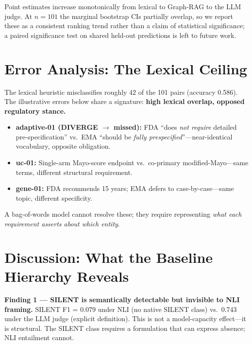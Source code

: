 \documentclass[sigconf]{acmart}
\begin{document}
Point estimates increase monotonically from lexical to Graph-RAG to the LLM
judge. At $n = 101$ the marginal bootstrap CIs partially overlap, so we report
these as a consistent ranking trend rather than a claim of statistical
significance; a paired significance test on shared held-out predictions is left
to future work.

\section{Error Analysis: The Lexical Ceiling}

The lexical heuristic misclassifies roughly 42 of the 101 pairs
(accuracy 0.586). The illustrative errors below share a signature:
\textbf{high lexical overlap, opposed regulatory stance.}

\begin{itemize}
\item \textbf{adaptive-01 (DIVERGE $\to$ missed):} FDA ``does \textit{not
  require} detailed pre-specification'' vs.\ EMA ``should be \textit{fully
  prespecified}''---near-identical vocabulary, opposite obligation.
\item \textbf{uc-01:} Single-arm Mayo-score endpoint vs.\ co-primary
  modified-Mayo---same terms, different structural requirement.
\item \textbf{gene-01:} FDA recommends 15 years; EMA defers to
  case-by-case---same topic, different specificity.
\end{itemize}

A bag-of-words model cannot resolve these; they require representing
\textit{what each requirement asserts about which entity}.

\section{Discussion: What the Baseline Hierarchy Reveals}
\label{sec:discussion}

\textbf{Finding 1 --- SILENT is semantically detectable but invisible to NLI
framing.} SILENT F1 = 0.079 under NLI (no native SILENT class) vs.\ 0.743
under the LLM judge (explicit definition). This is not a model-capacity
effect---it is structural. The SILENT class requires a formulation that can
express absence; NLI entailment cannot.
\end{document}
